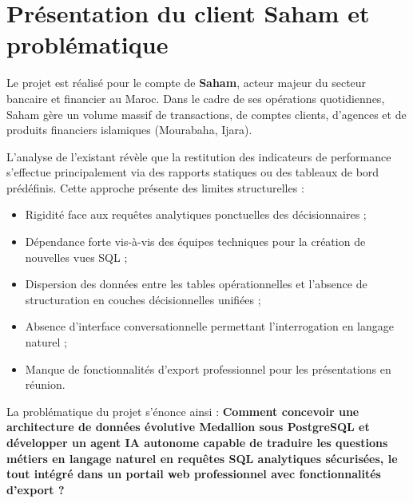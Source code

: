 \documentclass[a4paper,12pt]{report}
\begin{document}
\section{Présentation du client Saham et problématique}
\begin{doublespace}
Le projet est réalisé pour le compte de \textbf{Saham}, acteur majeur du secteur bancaire et financier au Maroc. Dans le cadre de ses opérations quotidiennes, Saham gère un volume massif de transactions, de comptes clients, d'agences et de produits financiers islamiques (Mourabaha, Ijara).

\noindent L'analyse de l'existant révèle que la restitution des indicateurs de performance s'effectue principalement via des rapports statiques ou des tableaux de bord prédéfinis. Cette approche présente des limites structurelles :
\begin{itemize}
    \item Rigidité face aux requêtes analytiques ponctuelles des décisionnaires ;
    \item Dépendance forte vis-à-vis des équipes techniques pour la création de nouvelles vues SQL ;
    \item Dispersion des données entre les tables opérationnelles et l'absence de structuration en couches décisionnelles unifiées ;
    \item Absence d'interface conversationnelle permettant l'interrogation en langage naturel ;
    \item Manque de fonctionnalités d'export professionnel pour les présentations en réunion.
\end{itemize}

\noindent La problématique du projet s'énonce ainsi : \textbf{Comment concevoir une architecture de données évolutive Medallion sous PostgreSQL et développer un agent IA autonome capable de traduire les questions métiers en langage naturel en requêtes SQL analytiques sécurisées, le tout intégré dans un portail web professionnel avec fonctionnalités d'export ?}
\end{doublespace}
\end{document}
